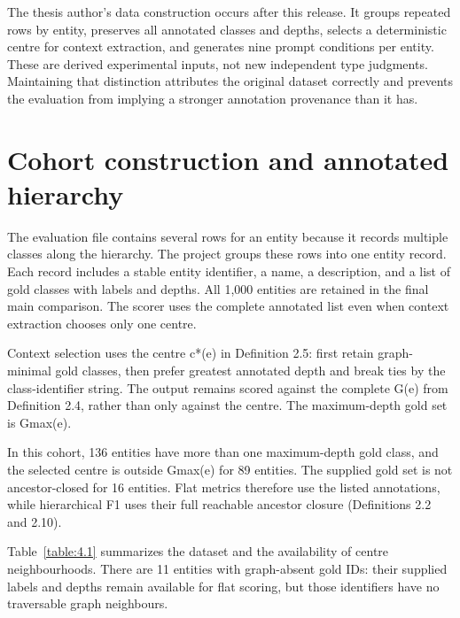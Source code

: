 The thesis author’s data construction occurs after this release. It groups repeated rows by entity, preserves all annotated classes and depths, selects a deterministic centre for context extraction, and generates nine prompt conditions per entity. These are derived experimental inputs, not new independent type judgments. Maintaining that distinction attributes the original dataset correctly and prevents the evaluation from implying a stronger annotation provenance than it has.


\FloatBarrier

\section{Cohort construction and annotated hierarchy}

The evaluation file contains several rows for an entity because it records multiple classes along the hierarchy. The project groups these rows into one entity record. Each record includes a stable entity identifier, a name, a description, and a list of gold classes with labels and depths. All 1,000 entities are retained in the final main comparison. The scorer uses the complete annotated list even when context extraction chooses only one centre.


Context selection uses the centre c*(e) in Definition 2.5: first retain graph-minimal gold classes, then prefer greatest annotated depth and break ties by the class-identifier string. The output remains scored against the complete G(e) from Definition 2.4, rather than only against the centre. The maximum-depth gold set is Gmax(e).


In this cohort, 136 entities have more than one maximum-depth gold class, and the selected centre is outside Gmax(e) for 89 entities. The supplied gold set is not ancestor-closed for 16 entities. Flat metrics therefore use the listed annotations, while hierarchical F1 uses their full reachable ancestor closure (Definitions 2.2 and 2.10).


Table~\ref{table:4.1} summarizes the dataset and the availability of centre neighbourhoods. There are 11 entities with graph-absent gold IDs: their supplied labels and depths remain available for flat scoring, but those identifiers have no traversable graph neighbours.


